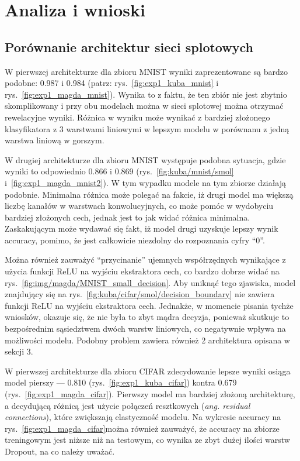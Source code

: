 \documentclass[10pt]{article}
\begin{document}
\pagebreak
\section{Analiza i wnioski}\label{sec:wyniki}
\subsection*{Porównanie architektur sieci splotowych}
W pierwszej architekturze dla zbioru MNIST wyniki zaprezentowane są bardzo podobne:
0.987 i 0.984 (patrz: rys.~\ref{fig:exp1_kuba_mnist} i rys.~\ref{fig:exp1_magda_mnist}).
Wynika to z faktu, że ten zbiór nie jest zbytnio skomplikowany i przy obu modelach można w sieci splotowej można otrzymać rewelacyjne wyniki.
Różnica w wyniku może wynikać z bardziej złożonego klasyfikatora z 3 warstwami liniowymi w lepszym modelu w porównanu z jedną warstwa liniową w gorszym.

W drugiej architekturze dla zbioru MNIST występuje podobna sytuacja, gdzie wyniki to odpowiednio 0.866 i 0.869 (rys.~\ref{fig:kuba/mnist/smol} i~\ref{fig:exp1_magda_mnist2}).
W tym wypadku modele na tym zbiorze działają podobnie.
Minimalna różnica może polegać na fakcie, iż drugi model ma większą liczbę kanałów w warstwach konwolucyjnych, co może pomóc w wydobyciu bardziej złożonych cech, jednak jest to jak widać różnica minimalna.
Zaskakującym może wydawać się fakt, iż model drugi uzyskuje lepszy wynik accuracy, pomimo, że jest całkowicie niezdolny do rozpoznania cyfry ``0''.

Można również zauważyć ``przycinanie'' ujemnych współrzędnych wynikające z użycia funkcji ReLU na wyjściu ekstraktora cech,
co bardzo dobrze widać na rys.~\ref{fig:img/magda/MNIST_small_decision}.
Aby uniknąć tego zjawiska, model znajdujący się na rys.~\ref{fig:kuba/cifar/smol/decision_boundary} nie zawiera funkcji ReLU na wyjściu ekstraktora cech.
Jednakże, w momencie pisania tychże wniosków, okazuje się, że nie była to zbyt mądra decyzja, ponieważ skutkuje to bezpośrednim sąsiedztwem dwóch warstw liniowych, co negatywnie wpływa na możliwości modelu.
Podobny problem zawiera również 2 architektura opisana w sekcji 3.

W pierwszej architekturze dla zbioru CIFAR zdecydowanie lepsze wyniki osiąga model pierszy ---
0.810 (rys.~\ref{fig:exp1_kuba_cifar}) kontra 0.679 (rys.~\ref{fig:exp1_magda_cifar}).
Pierwszy model ma bardziej złożoną architekturę, a decydującą różnicą jest użycie połączeń resztkowych (\emph{ang. residual connections}), które zwiększają elastyczność modelu.
Na wykresie accuracy na rys.~\ref{fig:exp1_magda_cifar}można również zauważyć, że accuracy na zbiorze treningowym jest niższe niż na testowym, co wynika ze zbyt dużej ilości warstw Dropout, na co należy uważać.
\end{document}
